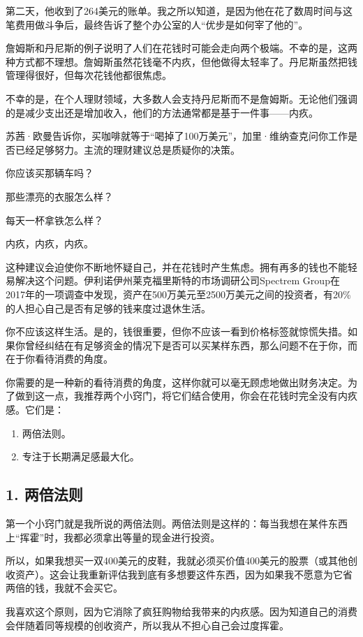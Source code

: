第二天，他收到了264美元的账单。我之所以知道，是因为他在花了数周时间与这笔费用做斗争后，最终告诉了整个办公室的人“优步是如何宰了他的”。

詹姆斯和丹尼斯的例子说明了人们在花钱时可能会走向两个极端。不幸的是，这两种方式都不理想。詹姆斯虽然花钱毫不内疚，但他做得太轻率了。丹尼斯虽然把钱管理得很好，但每次花钱他都很焦虑。

不幸的是，在个人理财领域，大多数人会支持丹尼斯而不是詹姆斯。无论他们强调的是减少支出还是增加收入，他们的方法通常都是基于一件事——内疚。

苏茜·欧曼告诉你，买咖啡就等于“喝掉了100万美元”，加里·维纳查克问你工作是否已经足够努力。主流的理财建议总是质疑你的决策。

你应该买那辆车吗？

那些漂亮的衣服怎么样？

每天一杯拿铁怎么样？

内疚，内疚，内疚。

这种建议会迫使你不断地怀疑自己，并在花钱时产生焦虑。拥有再多的钱也不能轻易解决这个问题。伊利诺伊州莱克福里斯特的市场调研公司Spectrem Group在2017年的一项调查中发现，资产在500万美元至2500万美元之间的投资者，有20\%的人担心自己是否有足够的钱来度过退休生活。

你不应该这样生活。是的，钱很重要，但你不应该一看到价格标签就惊慌失措。如果你曾经纠结在有足够资金的情况下是否可以买某样东西，那么问题不在于你，而在于你看待消费的角度。

你需要的是一种新的看待消费的角度，这样你就可以毫无顾虑地做出财务决定。为了做到这一点，我推荐两个小窍门，将它们结合使用，你会在花钱时完全没有内疚感。它们是：

\begin{enumerate}
\item 两倍法则。
\item 专注于长期满足感最大化。
\end{enumerate}
\subsection{1. 两倍法则}
第一个小窍门就是我所说的两倍法则。两倍法则是这样的：每当我想在某件东西上“挥霍”时，我都必须拿出等量的现金进行投资。

所以，如果我想买一双400美元的皮鞋，我就必须买价值400美元的股票（或其他创收资产）。这会让我重新评估我到底有多想要这件东西，因为如果我不愿意为它省两倍的钱，我就不会买它。

我喜欢这个原则，因为它消除了疯狂购物给我带来的内疚感。因为知道自己的消费会伴随着同等规模的创收资产，所以我从不担心自己会过度挥霍。

